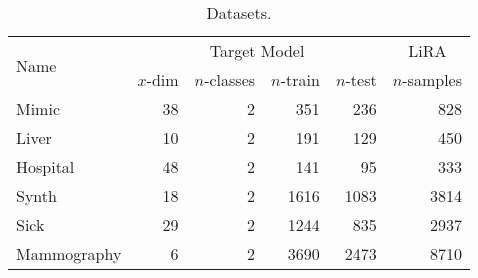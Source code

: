 \begin{table}[t]
    \caption{Datasets.}%
    \label{table:datasets}
    \small
    \centering
    \begin{tabular}{lrrrr|r}
        \toprule
        \multirow{2}{*}{Name} & \multicolumn{4}{c}{Target Model} & \multicolumn{1}{c}{LiRA}\\
        & $x$-dim & $n$-classes & $n$-train & $n$-test & $n$-samples\\
        \midrule
        Mimic & 38 & 2 & 351 & 236 & 828 \\
        Liver & 10 & 2 & 191 & 129 & 450 \\
        Hospital & 48 & 2 & 141 & 95 & 333 \\
        Synth & 18 & 2 & 1616 & 1083 & 3814 \\
        Sick & 29 & 2 & 1244 & 835 & 2937 \\
        Mammography & 6 & 2 & 3690 & 2473 & 8710 \\
        \bottomrule
    \end{tabular}
\end{table}
